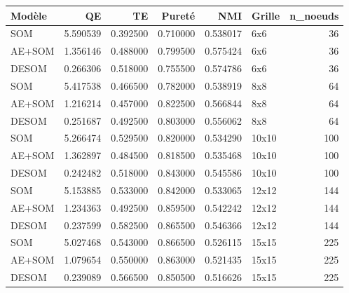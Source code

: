 \begin{tabular}{lrrrrlr}
\toprule
Modèle & QE & TE & Pureté & NMI & Grille & n_noeuds \\
\midrule
SOM & 5.590539 & 0.392500 & 0.710000 & 0.538017 & 6x6 & 36 \\
AE+SOM & 1.356146 & 0.488000 & 0.799500 & 0.575424 & 6x6 & 36 \\
DESOM & 0.266306 & 0.518000 & 0.755500 & 0.574786 & 6x6 & 36 \\
SOM & 5.417538 & 0.466500 & 0.782000 & 0.538919 & 8x8 & 64 \\
AE+SOM & 1.216214 & 0.457000 & 0.822500 & 0.566844 & 8x8 & 64 \\
DESOM & 0.251687 & 0.492500 & 0.803000 & 0.556062 & 8x8 & 64 \\
SOM & 5.266474 & 0.529500 & 0.820000 & 0.534290 & 10x10 & 100 \\
AE+SOM & 1.362897 & 0.484500 & 0.818500 & 0.535468 & 10x10 & 100 \\
DESOM & 0.242482 & 0.518000 & 0.843000 & 0.545586 & 10x10 & 100 \\
SOM & 5.153885 & 0.533000 & 0.842000 & 0.533065 & 12x12 & 144 \\
AE+SOM & 1.234363 & 0.492500 & 0.859500 & 0.542242 & 12x12 & 144 \\
DESOM & 0.237599 & 0.582500 & 0.865500 & 0.546366 & 12x12 & 144 \\
SOM & 5.027468 & 0.543000 & 0.866500 & 0.526115 & 15x15 & 225 \\
AE+SOM & 1.079654 & 0.550000 & 0.863000 & 0.521435 & 15x15 & 225 \\
DESOM & 0.239089 & 0.566500 & 0.850500 & 0.516626 & 15x15 & 225 \\
\bottomrule
\end{tabular}
